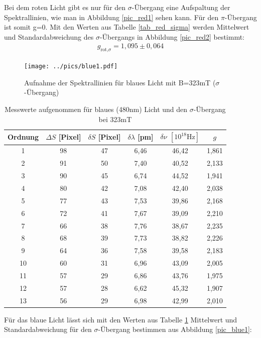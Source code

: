 Bei dem roten Licht gibt es nur für den $\sigma$-Übergang eine Aufspaltung der Spektrallinien, wie man in Abbildung \ref{pic_red1} sehen kann. Für den $\pi$-Übergang ist somit g=0. Mit den Werten aus Tabelle \ref{tab_red_sigma} werden Mittelwert und Standardabweichung des $\sigma$-Übergangs in Abbildung \ref{pic_red2} bestimmt:
\begin{align*}
g_{\text{rot,}\sigma}=1,095\pm0,064
\end{align*}
\begin{figure}[htbp]
\texttt{[image: ../pics/blue1.pdf]}
\caption{Aufnahme der Spektrallinien für blaues Licht mit B=323mT ($\sigma$-Übergang)}
\label{pic_blue2}
\end{figure}
\begin{table}[htbp]
    \begin{tabular}{|c|c|c|c|c|c|}
        Ordnung & $\Delta S$ [Pixel]    & $\delta S$ [Pixel]    &$\delta \lambda$ [pm]  & $\delta \nu$ $[10^{18}\text{Hz}]$ &   $g$\\\hline
        1&  98& 47& 6,46&   46,42&  1,861\\\hline
        2&  91& 50& 7,40&   40,52&  2,133\\\hline
        3&  90& 45& 6,74&   44,52&  1,941\\\hline
        4&  80& 42& 7,08&   42,40&  2,038\\\hline
        5&  77& 43& 7,53&   39,86&  2,168\\\hline
        6&  72& 41& 7,67&   39,09&  2,210\\\hline
        7&  66& 38& 7,76&   38,67&  2,235\\\hline
        8&  68& 39& 7,73&   38,82&  2,226\\\hline
        9&  64& 36& 7,58&   39,58&  2,183\\\hline
        10& 60& 31& 6,96&   43,09&  2,005\\\hline
        11& 57& 29& 6,86&   43,76&  1,975\\\hline
        12& 57& 28& 6,62&   45,32&  1,907\\\hline
        13& 56& 29& 6,98&   42,99&  2,010\\\hline
    \end{tabular}
    \caption{Messwerte aufgenommen für blaues (480nm) Licht und den $\sigma$-Übergang bei 323mT}
    \label{tab_blue_sigma}
\end{table}

Für das blaue Licht lässt sich mit den Werten aus Tabelle \ref{tab_blue_sigma} Mittelwert und Standardabweichung für den $\sigma$-Übergang bestimmen aus Abbildung \ref{pic_blue1}:

